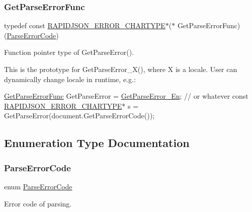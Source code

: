 \subsubsection{\texorpdfstring{Get\+Parse\+Error\+Func}{GetParseErrorFunc}}
{\footnotesize\ttfamily typedef const \hyperlink{group___r_a_p_i_d_j_s_o_n___e_r_r_o_r_s_ga7e4636fd48d0148f102b8a13f0539d8c}{R\+A\+P\+I\+D\+J\+S\+O\+N\+\_\+\+E\+R\+R\+O\+R\+\_\+\+C\+H\+A\+R\+T\+Y\+PE}$\ast$($\ast$ Get\+Parse\+Error\+Func) (\hyperlink{group___r_a_p_i_d_j_s_o_n___e_r_r_o_r_s_ga8d4b32dfc45840bca189ade2bbcb6ba7}{Parse\+Error\+Code})}



Function pointer type of Get\+Parse\+Error(). 

This is the prototype for {\ttfamily Get\+Parse\+Error\+\_\+\+X()}, where {\ttfamily X} is a locale. User can dynamically change locale in runtime, e.\+g.\+: 
\begin{DoxyCode}
\hyperlink{group___r_a_p_i_d_j_s_o_n___e_r_r_o_r_s_ga586548166441ab3ce30219cb35be2e04}{GetParseErrorFunc} GetParseError = \hyperlink{group___r_a_p_i_d_j_s_o_n___e_r_r_o_r_s_ga755b523205f46c980c80d12e230a3abd}{GetParseError\_En}; \textcolor{comment}{// or whatever}
\textcolor{keyword}{const} \hyperlink{group___r_a_p_i_d_j_s_o_n___e_r_r_o_r_s_ga7e4636fd48d0148f102b8a13f0539d8c}{RAPIDJSON\_ERROR\_CHARTYPE}* s = GetParseError(document.GetParseErrorCode());
\end{DoxyCode}
 

\subsection{Enumeration Type Documentation}
\mbox{\label{group___r_a_p_i_d_j_s_o_n___e_r_r_o_r_s_ga8d4b32dfc45840bca189ade2bbcb6ba7}} 
\subsubsection{\texorpdfstring{Parse\+Error\+Code}{ParseErrorCode}}
{\footnotesize\ttfamily enum \hyperlink{group___r_a_p_i_d_j_s_o_n___e_r_r_o_r_s_ga8d4b32dfc45840bca189ade2bbcb6ba7}{Parse\+Error\+Code}}



Error code of parsing. 

